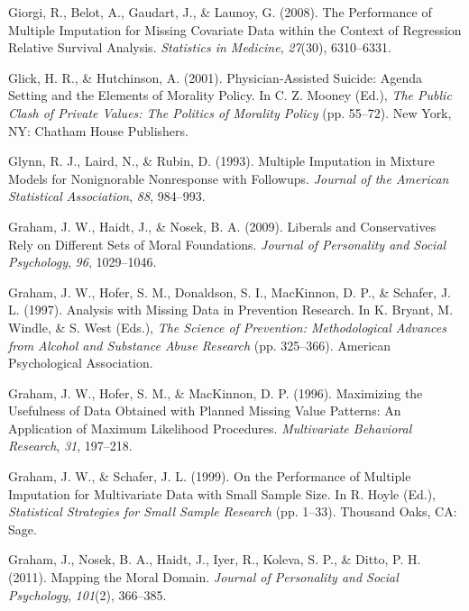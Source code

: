 \documentclass[12pt,econ]{sources/authesis}
\newenvironment{CSLReferences}%
  {}%
  {\par}
\begin{document}
\begin{CSLReferences}{1}{0}
\leavevmode{}%
Giorgi, R., Belot, A., Gaudart, J., \& Launoy, G. (2008). {The Performance of Multiple Imputation for Missing Covariate Data within the Context of Regression Relative Survival Analysis}. \emph{Statistics in Medicine}, \emph{27}(30), 6310--6331.

\leavevmode{}%
Glick, H. R., \& Hutchinson, A. (2001). {Physician-Assisted Suicide: Agenda Setting and the Elements of Morality Policy}. In C. Z. Mooney (Ed.), \emph{The {Public} {Clash} of {Private} {Values}: {The} {Politics} of {Morality} {Policy}} (pp. 55--72). New York, NY: Chatham House Publishers.

\leavevmode{}%
Glynn, R. J., Laird, N., \& Rubin, D. (1993). {Multiple Imputation in Mixture Models for Nonignorable Nonresponse with Followups}. \emph{Journal of the American Statistical Association}, \emph{88}, 984--993.

\leavevmode{}%
Graham, J. W., Haidt, J., \& Nosek, B. A. (2009). {Liberals and Conservatives Rely on Different Sets of Moral Foundations}. \emph{Journal of Personality and Social Psychology}, \emph{96}, 1029--1046.

\leavevmode{}%
Graham, J. W., Hofer, S. M., Donaldson, S. I., MacKinnon, D. P., \& Schafer, J. L. (1997). {Analysis with Missing Data in Prevention Research}. In K. Bryant, M. Windle, \& S. West (Eds.), \emph{{The Science of Prevention: Methodological Advances from Alcohol and Substance Abuse Research}} (pp. 325--366). American Psychological Association.

\leavevmode{}%
Graham, J. W., Hofer, S. M., \& MacKinnon, D. P. (1996). {Maximizing the Usefulness of Data Obtained with Planned Missing Value Patterns: An Application of Maximum Likelihood Procedures}. \emph{Multivariate Behavioral Research}, \emph{31}, 197--218.

\leavevmode{}%
Graham, J. W., \& Schafer, J. L. (1999). {On the Performance of Multiple Imputation for Multivariate Data with Small Sample Size}. In R. Hoyle (Ed.), \emph{{Statistical Strategies for Small Sample Research}} (pp. 1--33). Thousand Oaks, CA: Sage.

\leavevmode{}%
Graham, J., Nosek, B. A., Haidt, J., Iyer, R., Koleva, S. P., \& Ditto, P. H. (2011). {Mapping the Moral Domain}. \emph{Journal of Personality and Social Psychology}, \emph{101}(2), 366--385.


\end{CSLReferences}
\end{document}
